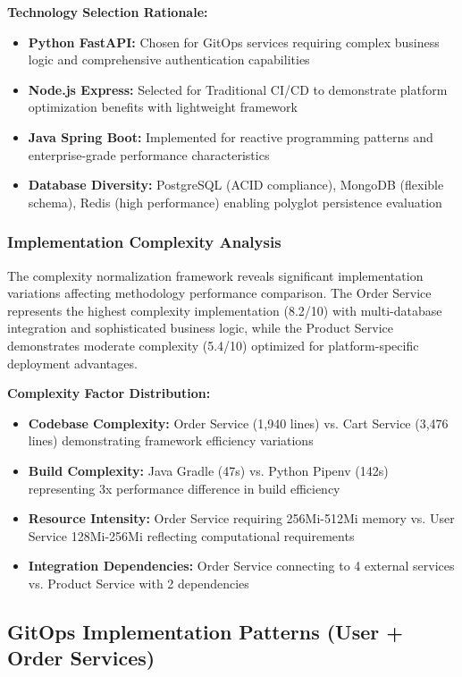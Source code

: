 \textbf{Technology Selection Rationale:}
\begin{itemize}
\item \textbf{Python FastAPI:} Chosen for GitOps services requiring complex business logic and comprehensive authentication capabilities
\item \textbf{Node.js Express:} Selected for Traditional CI/CD to demonstrate platform optimization benefits with lightweight framework
\item \textbf{Java Spring Boot:} Implemented for reactive programming patterns and enterprise-grade performance characteristics
\item \textbf{Database Diversity:} PostgreSQL (ACID compliance), MongoDB (flexible schema), Redis (high performance) enabling polyglot persistence evaluation
\end{itemize}

\subsubsection{Implementation Complexity Analysis}

The complexity normalization framework reveals significant implementation variations affecting methodology performance comparison. The Order Service represents the highest complexity implementation (8.2/10) with multi-database integration and sophisticated business logic, while the Product Service demonstrates moderate complexity (5.4/10) optimized for platform-specific deployment advantages.

\textbf{Complexity Factor Distribution:}
\begin{itemize}
\item \textbf{Codebase Complexity:} Order Service (1,940 lines) vs. Cart Service (3,476 lines) demonstrating framework efficiency variations
\item \textbf{Build Complexity:} Java Gradle (47s) vs. Python Pipenv (142s) representing 3x performance difference in build efficiency
\item \textbf{Resource Intensity:} Order Service requiring 256Mi-512Mi memory vs. User Service 128Mi-256Mi reflecting computational requirements
\item \textbf{Integration Dependencies:} Order Service connecting to 4 external services vs. Product Service with 2 dependencies
\end{itemize}

\subsection{GitOps Implementation Patterns (User + Order Services)}

